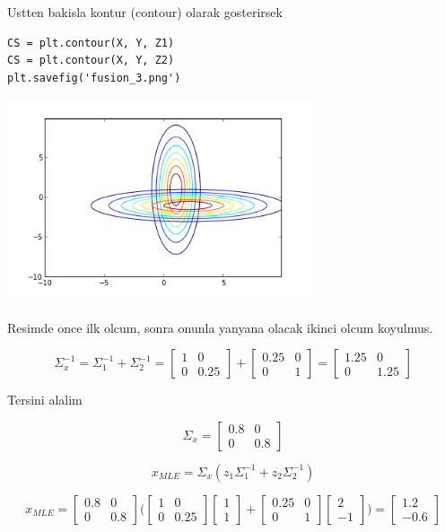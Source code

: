 \documentclass[12pt,fleqn]{article}\usepackage{../common}
\begin{document}
Ustten bakisla kontur (contour) olarak gosterirsek 

\begin{verbatim}
CS = plt.contour(X, Y, Z1)
CS = plt.contour(X, Y, Z2)
plt.savefig('fusion_3.png')
\end{verbatim}

\includegraphics[height=6cm]{fusion_3.png}


Resimde once ilk olcum, sonra onunla yanyana olacak ikinci olcum koyulmus. 

$$ \Sigma_x^{-1} = \Sigma_1^{-1} + \Sigma_2^{-1}  =
\left[\begin{array}{cc}
1 & 0 \\ 0 & 0.25
\end{array}\right] + 
\left[\begin{array}{cc}
0.25 & 0 \\ 0 & 1
\end{array}\right] =
\left[\begin{array}{cc}
1.25 & 0 \\ 0 & 1.25
\end{array}\right] 
$$

Tersini alalim 

$$ \Sigma_x =
\left[\begin{array}{cc}
0.8 & 0 \\ 0 & 0.8
\end{array}\right] 
$$

$$ x_{MLE} =  \Sigma_x (z_1\Sigma_1^{-1}  + z_2\Sigma_2^{-1}) $$

$$ 
x_{MLE} =
\left[\begin{array}{cc}
0.8 & 0 \\ 0 & 0.8
\end{array}\right] 
\bigg(
\left[\begin{array}{cc}
1 & 0 \\ 0 & 0.25
\end{array}\right] 
\left[\begin{array}{c}
1 \\ 1
\end{array}\right]  + 
\left[\begin{array}{cc}
0.25 & 0 \\ 0 & 1
\end{array}\right] 
\left[\begin{array}{r}
2 \\ -1
\end{array}\right]  
\bigg) = 
\left[\begin{array}{r}
1.2 \\ -0.6
\end{array}\right]  
$$
\end{document}

